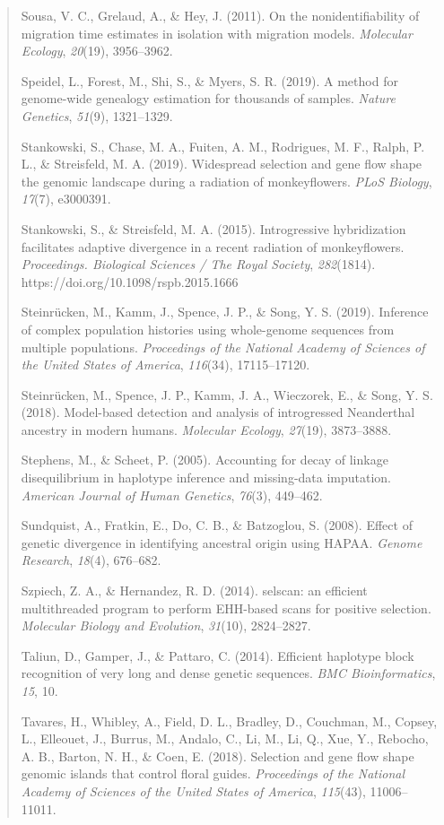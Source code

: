 \documentclass[
]{article}
\begin{document}
\begin{quote}
Sousa, V. C., Grelaud, A., \& Hey, J. (2011). On the nonidentifiability
of migration time estimates in isolation with migration models.
\emph{Molecular Ecology}, \emph{20}(19), 3956--3962.

Speidel, L., Forest, M., Shi, S., \& Myers, S. R. (2019). A method for
genome-wide genealogy estimation for thousands of samples. \emph{Nature
Genetics}, \emph{51}(9), 1321--1329.

Stankowski, S., Chase, M. A., Fuiten, A. M., Rodrigues, M. F., Ralph, P.
L., \& Streisfeld, M. A. (2019). Widespread selection and gene flow
shape the genomic landscape during a radiation of monkeyflowers.
\emph{PLoS Biology}, \emph{17}(7), e3000391.

Stankowski, S., \& Streisfeld, M. A. (2015). Introgressive hybridization
facilitates adaptive divergence in a recent radiation of monkeyflowers.
\emph{Proceedings. Biological Sciences / The Royal Society},
\emph{282}(1814). https://doi.org/10.1098/rspb.2015.1666

Steinrücken, M., Kamm, J., Spence, J. P., \& Song, Y. S. (2019).
Inference of complex population histories using whole-genome sequences
from multiple populations. \emph{Proceedings of the National Academy of
Sciences of the United States of America}, \emph{116}(34), 17115--17120.

Steinrücken, M., Spence, J. P., Kamm, J. A., Wieczorek, E., \& Song, Y.
S. (2018). Model-based detection and analysis of introgressed
Neanderthal ancestry in modern humans. \emph{Molecular Ecology},
\emph{27}(19), 3873--3888.

Stephens, M., \& Scheet, P. (2005). Accounting for decay of linkage
disequilibrium in haplotype inference and missing-data imputation.
\emph{American Journal of Human Genetics}, \emph{76}(3), 449--462.

Sundquist, A., Fratkin, E., Do, C. B., \& Batzoglou, S. (2008). Effect
of genetic divergence in identifying ancestral origin using HAPAA.
\emph{Genome Research}, \emph{18}(4), 676--682.

Szpiech, Z. A., \& Hernandez, R. D. (2014). selscan: an efficient
multithreaded program to perform EHH-based scans for positive selection.
\emph{Molecular Biology and Evolution}, \emph{31}(10), 2824--2827.

Taliun, D., Gamper, J., \& Pattaro, C. (2014). Efficient haplotype block
recognition of very long and dense genetic sequences. \emph{BMC
Bioinformatics}, \emph{15}, 10.

Tavares, H., Whibley, A., Field, D. L., Bradley, D., Couchman, M.,
Copsey, L., Elleouet, J., Burrus, M., Andalo, C., Li, M., Li, Q., Xue,
Y., Rebocho, A. B., Barton, N. H., \& Coen, E. (2018). Selection and
gene flow shape genomic islands that control floral guides.
\emph{Proceedings of the National Academy of Sciences of the United
States of America}, \emph{115}(43), 11006--11011.


\end{quote}
\end{document}
